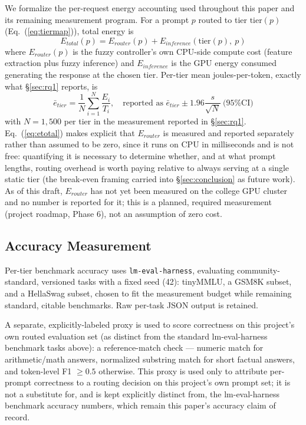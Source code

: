 \documentclass[conference]{IEEEtran}
\begin{document}
We formalize the per-request energy accounting used throughout this
paper and its remaining measurement program. For a prompt $p$ routed to
tier $\text{tier}(p)$ (Eq.~(\ref{eq:tiermap})), total energy is
\begin{equation}
E_{total}(p) = E_{router}(p) + E_{inference}(\text{tier}(p),\ p)
\label{eq:etotal}
\end{equation}
where $E_{router}(p)$ is the fuzzy controller's own CPU-side compute cost
(feature extraction plus fuzzy inference) and $E_{inference}$ is the GPU
energy consumed generating the response at the chosen tier. Per-tier
mean joules-per-token, exactly what \S\ref{sec:rq1} reports, is
\begin{equation}
\bar{e}_{tier} = \frac{1}{N}\sum_{i=1}^{N} \frac{E_i}{T_i},\quad
\text{reported as } \bar{e}_{tier} \pm 1.96\frac{s}{\sqrt{N}}\ \text{(95\% CI)}
\label{eq:ebar}
\end{equation}
with $N = 1{,}500$ per tier in the measurement reported in
\S\ref{sec:rq1}. Eq.~(\ref{eq:etotal}) makes explicit that $E_{router}$
is measured and reported separately rather than assumed to be zero,
since it runs on CPU in milliseconds and is not free: quantifying it is
necessary to determine whether, and at what prompt lengths, routing
overhead is worth paying relative to always serving at a single static
tier (the break-even framing carried into \S\ref{sec:conclusion} as
future work). As of this draft, $E_{router}$ has not yet been measured on
the college GPU cluster and no number is reported for it; this is a
planned, required measurement (project roadmap, Phase 6), not an
assumption of zero cost.

\subsection{Accuracy Measurement}

Per-tier benchmark accuracy uses \texttt{lm-eval-harness}, evaluating
community-standard, versioned tasks with a fixed seed (42): tinyMMLU, a
GSM8K subset, and a HellaSwag subset, chosen to fit the measurement
budget while remaining standard, citable benchmarks. Raw per-task JSON
output is retained.

A separate, explicitly-labeled proxy is used to score correctness on
this project's own routed evaluation set (as distinct from the standard
lm-eval-harness benchmark tasks above): a reference-match check ---
numeric match for arithmetic/math answers, normalized substring match
for short factual answers, and token-level F1 $\ge 0.5$ otherwise. This
proxy is used only to attribute per-prompt correctness to a routing
decision on this project's own prompt set; it is not a substitute for,
and is kept explicitly distinct from, the lm-eval-harness benchmark
accuracy numbers, which remain this paper's accuracy claim of record.
\end{document}
